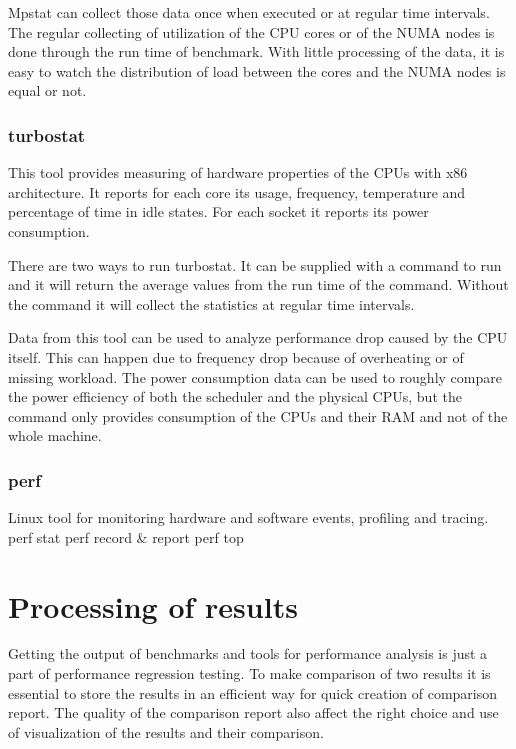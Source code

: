 Mpstat can collect those data once when executed or at regular time intervals.
The regular collecting of utilization of the CPU cores or of the NUMA nodes is
done through the run time of benchmark. With little processing of the data, it
is easy to watch the distribution of load between the cores and the NUMA nodes
is equal or not.

\subsection{turbostat}
This tool provides measuring of hardware properties of the CPUs with x86
architecture. It reports for each core its usage, frequency, temperature and
percentage of time in idle states. For each socket it reports its power consumption.

There are two ways to run turbostat. It can be supplied with a command to run
and it will return the average values from the run time of the command. Without
the command it will collect the statistics at regular time intervals.

Data from this tool can be used to analyze performance drop caused by the CPU
itself. This can happen due to frequency drop because of overheating or of
missing workload. The power consumption data can be used to roughly compare the
power efficiency of both the scheduler and the physical CPUs, but the command
only provides consumption of the CPUs and their RAM and not of the whole
machine.


\subsection{perf}
Linux tool for monitoring hardware and software events, profiling and tracing.
perf stat
perf record \& report
perf top



\chapter{Processing of results} \label{ch:processing}
Getting the output of benchmarks and tools for performance analysis is just a
part of performance regression testing. To make comparison of two results it is
essential to store the results in an efficient way for quick creation of
comparison report. The quality of the comparison report also affect the right
choice and use of visualization of the results and their comparison.

